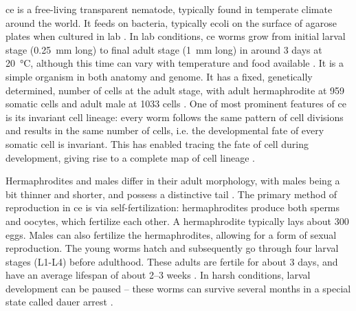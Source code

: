 \ac{ce} is a free-living transparent nematode, typically found in temperate climate around the world. It feeds on bacteria, typically \ac{ecoli} on the surface of agarose plates when cultured in lab \citep{brenner1974genetics}. In lab conditions, \ac{ce} worms grow from initial larval stage (\SI{0.25}{\milli\meter} long) to final adult stage (\SI{1}{\milli\meter} long) in around \num{3} days at \SI{20}{\celsius}, although this time can vary with temperature and food available \citep{corsi2015transparent,brenner1974genetics,lee2009regulation}. It is a simple organism in both anatomy and genome. It has a fixed, genetically determined, number of cells at the adult stage, with adult hermaphrodite at 959 somatic cells and adult male at 1033 cells \citep{sulston1983embryonic,kimble1979postembryonic}. One of most prominent features of \ac{ce} is its invariant cell lineage: every worm follows the same pattern of cell divisions and results in the same number of cells, i.e. the developmental fate of every somatic cell is invariant. This has enabled tracing the fate of cell during development, giving rise to a complete map of cell lineage \citep{sulston1983embryonic,sulston1975dopaminergic,kimble1979postembryonic}. 

Hermaphrodites and males differ in their adult morphology, with males being a bit thinner and shorter, and possess a distinctive tail \citep{corsi2015transparent}. The primary method of reproduction in \ac{ce} is via self-fertilization: hermaphrodites produce both sperms and oocytes, which fertilize each other. A hermaphrodite typically lays about 300 eggs. Males can also fertilize the hermaphrodites, allowing for a form of sexual reproduction. The young worms hatch and subsequently go through four larval stages (L1-L4) before adulthood. These adults are fertile for about \num{3} days, and have an average lifespan of about \numrange{2}{3} weeks \citep{corsi2015transparent}. In harsh conditions, larval development can be paused -- these worms can survive several months in a special state called dauer arrest \citep{hu2007dauer}.

